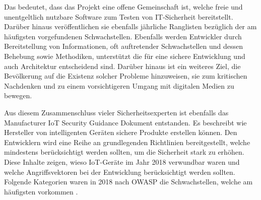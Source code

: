         Das bedeutet, dass das Projekt eine offene Gemeinschaft ist, welche freie und unentgeltlich nutzbare Software zum Testen von IT-Sicherheit bereitstellt. Darüber hinaus veröffentlichen sie ebenfalls jährliche Ranglisten bezüglich der am häufigsten vorgefundenen Schwachstellen. Ebenfalls werden Entwickler durch Bereitstellung von Informationen, oft auftretender Schwachstellen und dessen Behebung sowie Methodiken, unterstützt die für eine sichere Entwicklung und auch Architektur entscheidend sind. Darüber hinaus ist ein weiteres Ziel, die Bevölkerung auf die Existenz solcher Probleme hinzuweisen, sie zum kritischen Nachdenken und zu einem vorsichtigeren Umgang mit digitalen Medien zu bewegen.
        
        Aus diesem Zusammenschluss vieler Sicherheitsexperten ist ebenfalls das \glqq Manufacturer \ac{IoT} Security Guidance\grqq{} Dokument \cite{stahl_2017} entstanden. Es beschreibt wie Hersteller von intelligenten Geräten sichere Produkte erstellen können. Den Entwicklern wird eine Reihe an grundlegenden Richtlinien bereitgestellt, welche mindestens berücksichtigt werden sollten, um die Sicherheit stark zu erhöhen.
        Diese Inhalte zeigen, wieso \ac{IoT}-Geräte im Jahr 2018 verwundbar waren und welche Angriffsvektoren bei der Entwicklung berücksichtigt werden sollten. 
        Folgende Kategorien waren in 2018 nach \ac{OWASP} die Schwachstellen, welche am häufigsten vorkommen \cite{stahl_2017}. 
